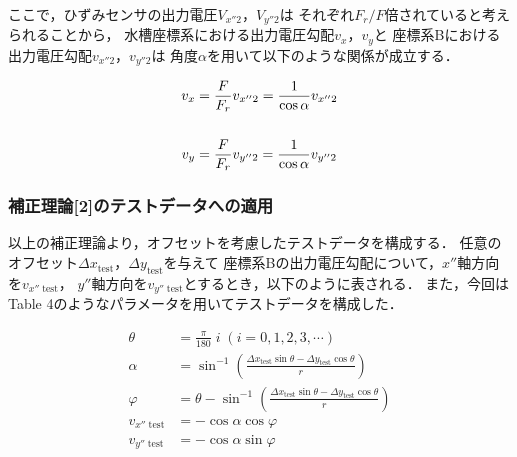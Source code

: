ここで，ひずみセンサの出力電圧$V_{x''2}$，$V_{y''2}$は
それぞれ$F_r / F$倍されていると考えられることから，
水槽座標系における出力電圧勾配$v_{x}$，$v_{y}$と
座標系Bにおける出力電圧勾配$v_{x''2}$，$v_{y''2}$は
角度$\alpha$を用いて以下のような関係が成立する．

\begin{align}
  v_{x} & = \frac{F}{F_r} v_{x''2} = \frac{1}{\cos \alpha} v_{x''2} \\
  \notag                                                            \\
  v_{y} & = \frac{F}{F_r} v_{y''2} = \frac{1}{\cos \alpha} v_{y''2}
\end{align}

\subsubsection{補正理論[2]のテストデータへの適用}

以上の補正理論より，オフセットを考慮したテストデータを構成する．
任意のオフセット$\Delta x_\mathrm{test}$，$\Delta y_\mathrm{test}$を与えて
座標系Bの出力電圧勾配について，$x''$軸方向を$v_{x''\;\mathrm{test}}$，
$y''$軸方向を$v_{y''\;\mathrm{test}}$とするとき，以下のように表される．
また，今回はTable 4のようなパラメータを用いてテストデータを構成した．

\begin{align}
  \theta                  & = \frac{\pi}{180} \; i \;\left(i = 0, 1, 2, 3, \cdots\right)                                                       \\
  \alpha                  & = \sin^{-1} \left( \frac{\Delta x_\mathrm{test} \sin \theta - \Delta y_\mathrm{test} \cos \theta}{r} \right)       \\
  \varphi                 & = \theta - \sin^{-1}\left(\frac{\Delta x_\mathrm{test} \sin \theta - \Delta y_\mathrm{test} \cos \theta}{r}\right) \\
  v_{x'' \;\mathrm{test}} & = - \cos \alpha \cos \varphi                                                                                       \\
  v_{y'' \;\mathrm{test}} & = - \cos \alpha \sin \varphi
\end{align}

